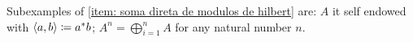\begin{exemplos}
\begin{itroman}
    \item Subexamples of \ref{item: soma direta de modulos de hilbert} are: $A$ it self endowed with $\langle {a},{b}\rangle \coloneqq a^*b$; $A^n = \bigoplus_{i =1}^n A$ for any natural number $n$.
    

\end{itroman}
\end{exemplos}
